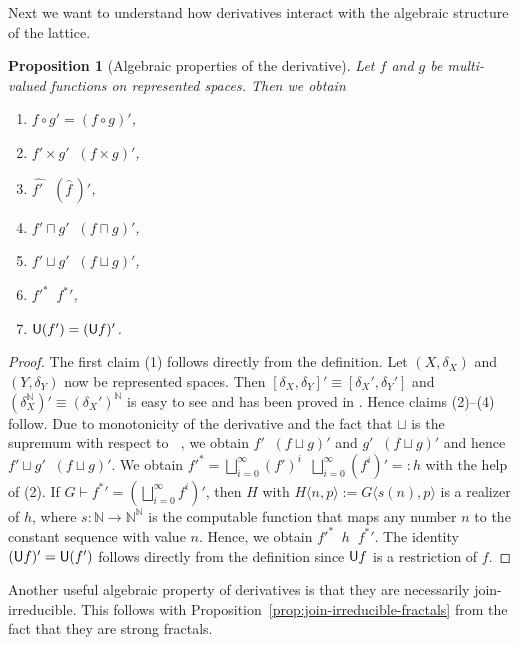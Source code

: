 \documentclass[a4paper]{amsart}
\def\IN{{\mathbb{N}}}
\def\Baire{{\IN^\IN}}
\def\U{\text{\rm\sffamily U}}
\def\leqSW{\mathop{\leq_{\mathrm{sW}}}}
\def\equivSW{\mathop{\equiv_{\mathrm{sW}}}}
\newtheorem{proposition}[theorem]{Proposition}
\theoremstyle{definition}
\begin{document}
Next we want to understand how derivatives interact with the algebraic structure of the lattice.

\begin{proposition}[Algebraic properties of the derivative]
\label{prop:products-parallelization}
Let $f$ and $g$ be multi-valued functions on represented spaces. Then we obtain
\begin{enumerate}
\item $f\circ g'=(f\circ g)'$,
\item $f'\times g'\equivSW(f\times g)'$,
\item $\widehat{f'\,}\equivSW (\widehat{f}\,)'$,
\item $f'\sqcap g'\equivSW (f\sqcap g)'$,
\item $f'\sqcup g'\leqSW(f\sqcup g)'$,
\item ${f'}^*\leqSW {f^*}'$,
\item $\U(f')=(\U f)'$.
\end{enumerate}
\end{proposition}
\begin{proof}
The first claim (1) follows directly from the definition.
Let $(X,\delta_X)$ and $(Y,\delta_Y)$ now be represented spaces.
Then $[\delta_X,\delta_Y]'\equiv[\delta_X',\delta_Y']$ and $(\delta_X^\IN)'\equiv(\delta_X')^\IN$
is easy to see and has been proved in \cite{Bra07x}. Hence claims (2)--(4) follow. 
Due to monotonicity of the derivative and the fact that $\sqcup$ is the supremum with respect to
$\leqSW$, we obtain $f'\leqSW(f\sqcup g)'$ and $g'\leqSW(f\sqcup g)'$ and hence $f'\sqcup g'\leqSW(f\sqcup g)'$.
We obtain ${f'}^*=\bigsqcup_{i=0}^\infty (f')^i\equivSW\bigsqcup_{i=0}^\infty (f^i)'=:h$ with the help of (2).
If $G\vdash {f^*}'=(\bigsqcup_{i=0}^\infty f^i)'$, then $H$ with $H\langle n,p\rangle:=G\langle s(n),p\rangle$ 
is a realizer of $h$, where $s:\IN\to\Baire$ is the computable function that maps any number 
$n$ to the constant sequence with value $n$. 
Hence, we obtain ${f'}^*\equivSW h\leqSW{f^*}'$. The identity $(\U f)'=\U(f')$ follows directly from the definition
since $\U f$ is a restriction of $f$.
\end{proof}

Another useful algebraic property of derivatives is that they are necessarily join-irreducible.
This follows with Proposition~\ref{prop:join-irreducible-fractals} from the fact that they are strong fractals.
\end{document}
